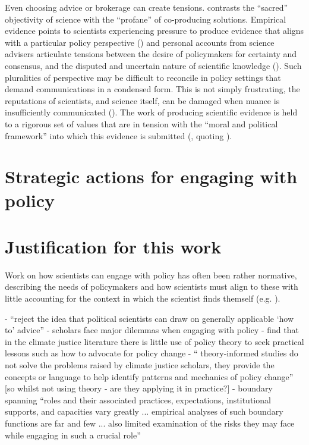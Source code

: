 Even choosing advice or brokerage can create tensions. \textcite{WesselinkH2020} contrasts the ``sacred'' objectivity of science with the ``profane'' of co-producing solutions. Empirical evidence points to scientists experiencing pressure to produce evidence that aligns with a particular policy perspective (\cite{MacKillopCDD2023}) and personal accounts from science advisers articulate tensions between the desire of policymakers for certainty and consensus, and the disputed and uncertain nature of scientific knowledge  (\cite{Stirling2010,Hicks2024}). Such pluralities of perspective may be difficult to reconcile in policy settings that demand communications in a condensed form. This is not simply frustrating, the reputations of scientists, and science itself, can be damaged when nuance is insufficiently communicated (\cite{Stirling2010,OjanenBKP2021}). The work of producing scientific evidence is held to a rigorous set of values that are in tension with the ``moral and political framework'' into which this evidence is submitted (\cite{Nau2009}, quoting \cite[p263]{Bull1972}).

\section{Strategic actions for engaging with policy}\label{sec:litstrategies}






\section{Justification for this work}
Work on how scientists can engage with policy has often been rather normative, describing the needs of policymakers and how scientists must align to these with little accounting for the context in which the scientist finds themself (e.g. \cite{McNie2007,GeddesDP2018,BlessenohlS2022,Bisbal2024}). 

\cite{CairneyO2020} - ``reject the idea that political scientists can draw on generally applicable `how to' advice''
\cite{CairneyO2020} - scholars face major dilemmas when engaging with policy
\cite{CairneyTS2023} - find that in the climate justice literature there is little use of policy theory to seek practical lessons such as how to advocate for policy change  - `` theory-informed studies do not solve the problems raised by climate justice scholars, they provide the concepts or language to help identify patterns and mechanics of policy change'' [so whilst not using theory - are they applying it in practice?]
\cite{JagannathanEtAl2023} - boundary spanning ``roles and their associated practices, expectations, institutional supports, and capacities vary greatly ... empirical analyses of such boundary functions are far and few ... also limited examination of the risks they may face while engaging in such a crucial role''

